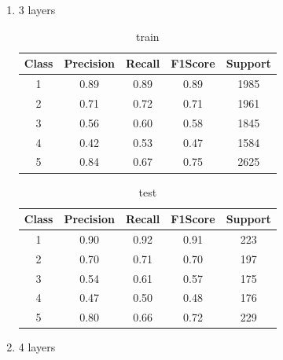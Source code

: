 \begin{enumerate}[label=(\alph*)]
\begin{enumerate}[label=\roman*.]
\begin{table}[!htb]
                    \end{table}
                    \newpage
              \item 3 layers
                    \begin{table}[!htb]
                        \centering
                        \begin{tabular}{ccccc}
                            \hline
                            Class & Precision & Recall & F1Score & Support \\ \hline
                            1     & 0.89      & 0.89   & 0.89    & 1985    \\
                            2     & 0.71      & 0.72   & 0.71    & 1961    \\
                            3     & 0.56      & 0.60   & 0.58    & 1845    \\
                            4     & 0.42      & 0.53   & 0.47    & 1584    \\
                            5     & 0.84      & 0.67   & 0.75    & 2625    \\ \hline
                        \end{tabular}
                        \caption{train}
                        \label{part d train depth 3}
                    \end{table}
                    \begin{table}[!htb]
                        \centering
                        \begin{tabular}{ccccc}
                            \hline
                            Class & Precision & Recall & F1Score & Support \\ \hline
                            1     & 0.90      & 0.92   & 0.91    & 223     \\
                            2     & 0.70      & 0.71   & 0.70    & 197     \\
                            3     & 0.54      & 0.61   & 0.57    & 175     \\
                            4     & 0.47      & 0.50   & 0.48    & 176     \\
                            5     & 0.80      & 0.66   & 0.72    & 229     \\ \hline
                        \end{tabular}
                        \caption{test}
                        \label{part d test depth 3}
                    \end{table}
              \item 4 layers

\end{enumerate}
\end{enumerate}
